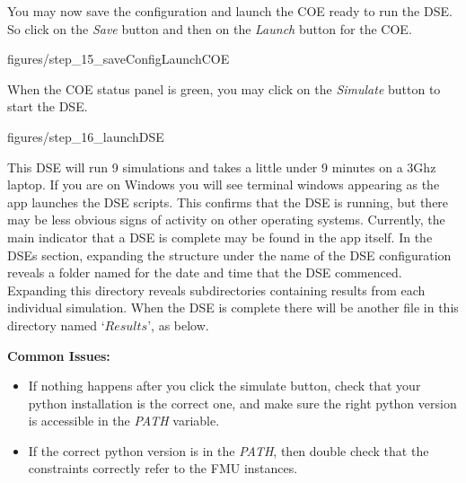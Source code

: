\documentclass[11pt,a4paper]{../tutorial}
\begin{document}
\begin{instructions}
\newpage

\item You may now save the configuration and launch the COE ready to run the DSE.  So click on the \emph{Save} button and then on the \emph{Launch} button for the COE.


\begin{center}\begin{annotation}[width=0.7\linewidth,trim=0 0 0 0,clip]{figures/step_15_saveConfigLaunchCOE}
    \end{annotation}\end{center}


When the COE status panel is green, you may click on the \emph{Simulate} button to start the DSE.



\begin{center}\begin{annotation}[width=0.7\linewidth,trim=0 0 0 0,clip]{figures/step_16_launchDSE}
    \end{annotation}\end{center}

\newpage
This DSE will run 9 simulations and takes a little under 9 minutes on a 3Ghz laptop. If you are on Windows you will see terminal windows appearing as the app launches the DSE scripts. This confirms that the DSE is running, but there may be less obvious signs of activity on other operating systems.  Currently, the main indicator that a DSE is complete may be found in the app itself.  In the DSEs section, expanding the structure under the name of the DSE configuration reveals a folder named for the date and time that the DSE commenced.  Expanding this directory reveals subdirectories containing results from each individual simulation.  When the DSE is complete there will be another file in this directory named `$Results$’, as below.

\textbf{Common Issues:}
\begin{itemize}
	\item If nothing happens after you click the simulate button, check that your python installation is the correct one, and make sure the right python version is accessible in the \emph{PATH} variable.
	\item If the correct python version is in the \emph{PATH}, then double check that the constraints correctly refer to the FMU instances.
\end{itemize}


\end{instructions}
\end{document}
